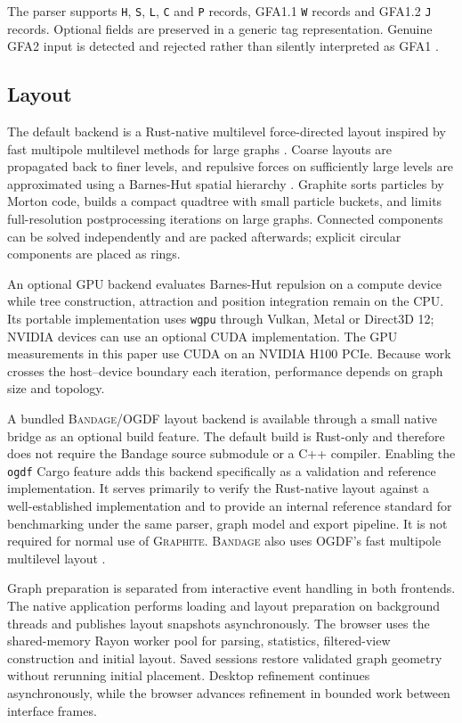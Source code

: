 \documentclass[11pt]{article}
\newcommand{\graphite}{\textsc{Graphite}\xspace}
\newcommand{\bandage}{\textsc{Bandage}\xspace}
\begin{document}
The parser supports \texttt{H}, \texttt{S}, \texttt{L}, \texttt{C} and \texttt{P} records, GFA1.1 \texttt{W} records and GFA1.2 \texttt{J} records. Optional fields are preserved in a generic tag representation. Genuine GFA2 input is detected and rejected rather than silently interpreted as GFA1 \citep{gfaspec}.

\subsection{Layout}
The default backend is a Rust-native multilevel force-directed layout inspired by fast multipole multilevel methods for large graphs \citep{hachul2007large}. Coarse layouts are propagated back to finer levels, and repulsive forces on sufficiently large levels are approximated using a Barnes-Hut spatial hierarchy \citep{barnes1986hierarchical}. Graphite sorts particles by Morton code, builds a compact quadtree with small particle buckets, and limits full-resolution postprocessing iterations on large graphs. Connected components can be solved independently and are packed afterwards; explicit circular components are placed as rings.

An optional GPU backend evaluates Barnes-Hut repulsion on a compute device while tree construction, attraction and position integration remain on the CPU. Its portable implementation uses \texttt{wgpu} through Vulkan, Metal or Direct3D 12; NVIDIA devices can use an optional CUDA implementation. The GPU measurements in this paper use CUDA on an NVIDIA H100 PCIe. Because work crosses the host--device boundary each iteration, performance depends on graph size and topology.

A bundled \bandage/OGDF layout backend is available through a small native bridge as an optional build feature. The default build is Rust-only and therefore does not require the Bandage source submodule or a C++ compiler. Enabling the \texttt{ogdf} Cargo feature adds this backend specifically as a validation and reference implementation. It serves primarily to verify the Rust-native layout against a well-established implementation and to provide an internal reference standard for benchmarking under the same parser, graph model and export pipeline. It is not required for normal use of \graphite. \bandage also uses OGDF's fast multipole multilevel layout \citep{wick2015bandage}.

Graph preparation is separated from interactive event handling in both frontends. The native application performs loading and layout preparation on background threads and publishes layout snapshots asynchronously. The browser uses the shared-memory Rayon worker pool for parsing, statistics, filtered-view construction and initial layout. Saved sessions restore validated graph geometry without rerunning initial placement. Desktop refinement continues asynchronously, while the browser advances refinement in bounded work between interface frames.
\end{document}
